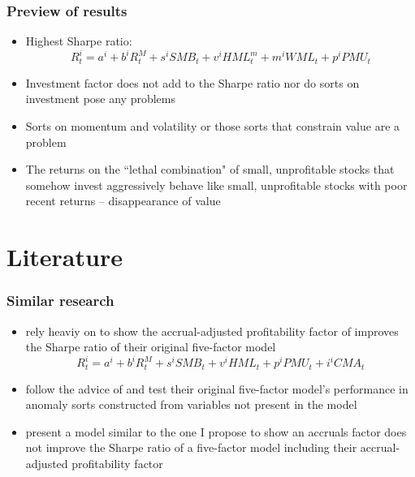 \documentclass{beamer}
\begin{document}
\begin{frame}
  \frametitle{Preview of results}
  \begin{itemize}
    \item Highest Sharpe ratio:
    \begin{equation}
      R_t^i=a^i + b^iR_t^M + s^iSMB_t + v^iHML_t^m + m^iWML_t + p^iPMU_t
    \end{equation}
    \item Investment factor does not add to the Sharpe ratio nor do sorts on
    investment pose any problems
    \item Sorts on momentum and volatility or those sorts that constrain value
    are a problem
    \item The returns on the ``lethal combination" \parencite{fama2015five,
    fama2016dissecting} of small, unprofitable stocks that somehow invest
    aggressively behave like small, unprofitable stocks with poor recent
    returns -- disappearance of value
  \end{itemize}
\end{frame}

\section{Literature}

\begin{frame}
  \frametitle{Similar research}
  \begin{itemize}
    \item \textcite{fama2016choosing} rely heaviy on
    \textcite{barillas2016alpha} to show the accrual-adjusted profitability
    factor of \textcite{ball2016accruals} improves the Sharpe ratio of their
    original five-factor model \parencite{fama2015five}
    \begin{equation}
      R_t^i=a^i + b^iR_t^M + s^iSMB_t + v^iHML_t + p^iPMU_t + i^iCMA_t
    \end{equation}
    \item \textcite{fama2016dissecting} follow the advice of
    \textcite{lewellen2010skeptical} and test their original five-factor
    model's performance in anomaly sorts constructed from variables not present
    in the model
    \item \textcite{ball2016accruals} present a model similar to the one I
    propose to show an accruals factor does not improve the Sharpe ratio of a
    five-factor model including their accrual-adjusted profitability factor
  \end{itemize}
\end{frame}
\end{document}

